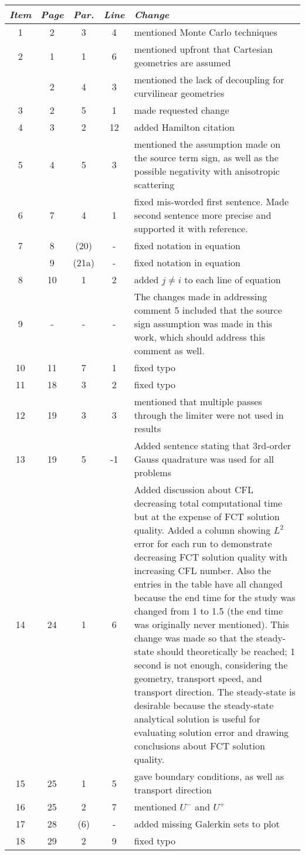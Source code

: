 \begin{tabular}{c c c c p{3in}}
\emph{Item} & \emph{Page} & \emph{Par.} & \emph{Line} & \emph{Change}\\\hline
1 & 2 & 3 & 4 & mentioned Monte Carlo techniques\\
2 & 1 & 1 & 6 & mentioned upfront that Cartesian geometries are assumed\\
  & 2 & 4 & 3 & mentioned the lack of decoupling for curvilinear geometries\\
3 & 2 & 5 & 1 & made requested change\\
4 & 3 & 2 & 12 & added Hamilton citation\\
5 & 4 & 5 & 3 & mentioned the assumption made on the source term sign, as
  well as the possible negativity with anisotropic scattering\\
6 & 7 & 4 & 1 & fixed mis-worded first sentence. Made second sentence more
  precise and supported it with reference.\\
7 & 8 & (20) & - & fixed notation in equation\\
  & 9 & (21a) & - & fixed notation in equation\\
8 & 10 & 1 & 2 & added $j\ne i$ to each line of equation\\
9 & - & - & - & The changes made in addressing comment 5 included that the source
  sign assumption was made in this work, which should address this comment as well.\\
10 & 11 & 7 & 1 & fixed typo\\
11 & 18 & 3 & 2 & fixed typo\\
12 & 19 & 3 & 3 & mentioned that multiple passes through the limiter were not used in results\\
13 & 19 & 5 & -1 & Added sentence stating that 3rd-order Gauss quadrature was used for all problems\\
14 & 24 & 1 & 6 & Added discussion about CFL decreasing total computational time
  but at the expense of FCT solution quality. Added a column showing $L^2$ error
  for each run to demonstrate decreasing FCT solution quality with increasing
  CFL number. Also the entries in the table have all changed because the end
  time for the study was changed from 1 to 1.5 (the end time was originally never mentioned).
  This change was made so that the steady-state should theoretically be reached; 1 second
  is not enough, considering the geometry, transport speed, and transport direction.
  The steady-state is desirable because the steady-state analytical solution is
  useful for evaluating solution error and drawing conclusions about FCT solution quality.\\
15 & 25 & 1 & 5 & gave boundary conditions, as well as transport direction\\
16 & 25 & 2 & 7 & mentioned $U^-$ and $U^+$\\
17 & 28 & (6) & - & added missing Galerkin sets to plot\\
18 & 29 & 2 & 9 & fixed typo\\
\end{tabular}

